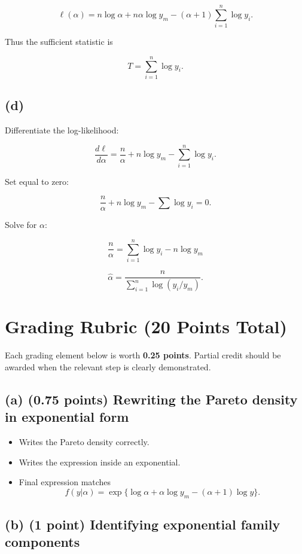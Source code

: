 \documentclass[12pt]{article}
\begin{document}
\[
\ell(\alpha)
=
n\log\alpha
+
n\alpha\log y_m
-
(\alpha+1)\sum_{i=1}^n \log y_i.
\]

Thus the sufficient statistic is

\[
T = \sum_{i=1}^n \log y_i.
\]

\subsection*{(d)}

Differentiate the log-likelihood:

\[
\frac{d\ell}{d\alpha}
=
\frac{n}{\alpha}
+
n\log y_m
-
\sum_{i=1}^n \log y_i.
\]

Set equal to zero:

\[
\frac{n}{\alpha}
+
n\log y_m
-
\sum \log y_i
=
0.
\]

Solve for $\alpha$:

\[
\frac{n}{\alpha}
=
\sum_{i=1}^n \log y_i - n\log y_m
\]

\[
\hat{\alpha}
=
\frac{n}{\sum_{i=1}^n \log(y_i/y_m)}.
\]

\newpage 

\section*{Grading Rubric (20 Points Total)}

Each grading element below is worth \textbf{0.25 points}. Partial credit should be awarded when the relevant step is clearly demonstrated.

\subsection*{(a) (0.75 points) Rewriting the Pareto density in exponential form}

\begin{itemize}
\item Writes the Pareto density correctly.
\item Writes the expression inside an exponential.
\item Final expression matches
\[
f(y|\alpha)=\exp\{\log\alpha+\alpha\log y_m-(\alpha+1)\log y\}.
\]
\end{itemize}

\subsection*{(b) (1 point) Identifying exponential family components}
\end{document}
